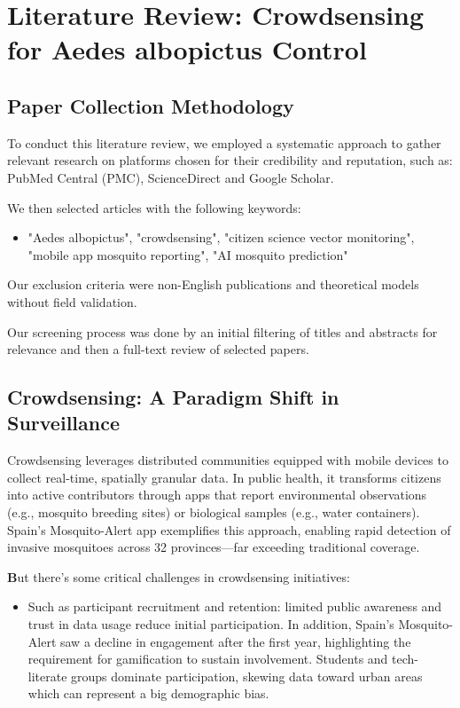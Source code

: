 \documentclass[acmlarge]{acmart}
\begin{document}
\section{Literature Review: Crowdsensing for Aedes albopictus Control}

\subsection{Paper Collection Methodology}
To conduct this literature review, we employed a systematic approach to gather relevant research on platforms chosen for their credibility and reputation, such as: PubMed Central (PMC), ScienceDirect and Google Scholar.

We then selected articles with the following keywords:
\begin{itemize}
\item "Aedes albopictus", "crowdsensing", "citizen science vector monitoring", "mobile app mosquito reporting", "AI mosquito prediction"
\end{itemize}

Our exclusion criteria were non-English publications and theoretical models without field validation.

Our screening process was done by an initial filtering of titles and abstracts for relevance and then a full-text review of selected papers. 

\subsection{Crowdsensing: A Paradigm Shift in Surveillance}

Crowdsensing leverages distributed communities equipped with mobile devices to collect real-time, spatially granular data. In public health, it transforms citizens into active contributors through apps that report environmental observations (e.g., mosquito breeding sites) or biological samples (e.g., water containers). Spain’s Mosquito-Alert app exemplifies this approach, enabling rapid detection of invasive mosquitoes across 32 provinces—far exceeding traditional coverage.

\textbf But there's some critical challenges in crowdsensing initiatives:

\begin{itemize}
\item Such as participant recruitment and retention: limited public awareness and trust in data usage reduce initial participation.
In addition, Spain's Mosquito-Alert saw a decline in engagement after the first year, highlighting the requirement for gamification to sustain involvement. Students and tech-literate groups dominate participation, skewing data toward urban areas which can represent a big demographic bias.\end{itemize}
\end{document}
